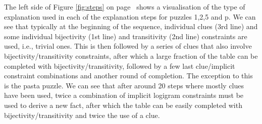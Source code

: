 
The left side of Figure \ref{fig:steps} on page~\pageref{fig:steps} shows a visualisation of the type of explanation used in each of the explanation steps for puzzles 1,2,5 and p. 
We can see that typically at the beginning of the sequence, individual clues (3rd line) and some individual bijectivity (1st line) and transitivity (2nd line) constraints are used, i.e., trivial ones.
This is then followed by a series of clues that also involve bijectivity/transitivity constraints, after which a large fraction of the table can be completed with bijectivity/transitivity, followed by a few last clue/implicit constraint combinations and another round of completion.
The exception to this is the pasta puzzle.
We can see that after around 20 steps where mostly clues have been used, twice a combination of implicit logigram constraints must be used to derive a new fact, after which the table can be easily completed with bijectivity/transitivity and twice the use of a clue.



